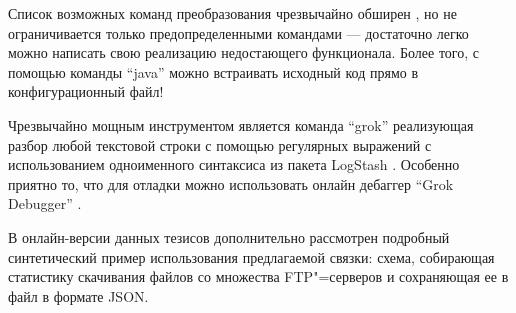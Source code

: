 \documentclass[10pt, a5paper]{article}
\begin{document}
Список возможных команд преобразования чрезвычайно обширен \cite{Pynkin4}, но не ограничивается только предопределенными командами --- достаточно легко можно написать свою реализацию недостающего функционала. Более того, с помощью команды ``java'' можно встраивать исходный код прямо в конфигурационный файл!

Чрезвычайно мощным инструментом является команда ``grok'' реализующая разбор любой текстовой строки с помощью регулярных выражений с использованием одноименного синтаксиса из пакета LogStash \cite{Pynkin5}. Особенно приятно то, что для отладки можно использовать онлайн дебаггер ``Grok Debugger'' \cite{Pynkin6}.

В онлайн-версии данных тезисов дополнительно рассмотрен подробный синтетический пример использования предлагаемой связки:  схема, собирающая статистику скачивания файлов со множества FTP"=серверов и сохраняющая ее в файл в формате JSON.
\end{document}
